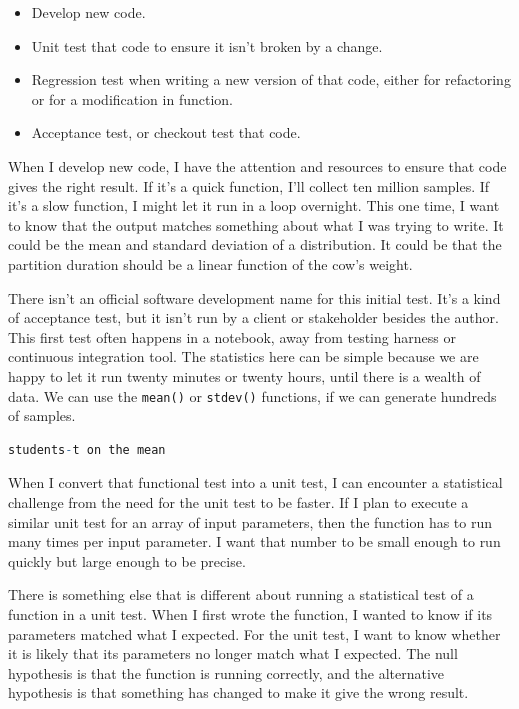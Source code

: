 \documentclass[fleqn,10pt]{olplainarticle}
\begin{document}
\begin{itemize}
	\item Develop new code.
	\item Unit test that code to ensure it isn't broken by a change.
	\item Regression test when writing a new version of that code,
	      either for refactoring or for a modification in function.
	\item Acceptance test, or checkout test that code.
\end{itemize}

When I develop new code, I have the attention and resources to ensure
that code gives the right result. If it's a quick function, I'll collect
ten million samples. If it's a slow function, I might let it run in a loop
overnight. This one time, I want to know that the output matches
something about what I was trying to write. It could be the mean and
standard deviation of a distribution. It could be that the partition
duration should be a linear function of the cow's weight.

There isn't an official software development name for this initial test.
It's a kind of acceptance test, but it isn't run by a client or stakeholder
besides the author. This first test often happens in a notebook, away from
testing harness or continuous integration tool.
The statistics here can be simple because we are happy
to let it run twenty minutes or twenty hours, until there is a wealth
of data. We can use the \lstinline|mean()| or \lstinline|stdev()| functions,
if we can generate hundreds of samples.

\begin{lstlisting}[language=R]
students-t on the mean
\end{lstlisting}

When I convert that functional test into a unit test, I can encounter
a statistical challenge from the need for the unit test to be faster.
If I plan to execute a similar unit test for an array of input parameters,
then the function has to run many times per input parameter. I want that
number to be small enough to run quickly but large enough to be precise.

There is something else that is different about running a statistical
test of a function in a unit test. When I first wrote the function,
I wanted to know if its parameters matched what I expected. For the unit
test, I want to know whether it is likely that its parameters no longer
match what I expected. The null hypothesis is that the function is running
correctly, and the alternative hypothesis is that something has changed
to make it give the wrong result.
\end{document}
